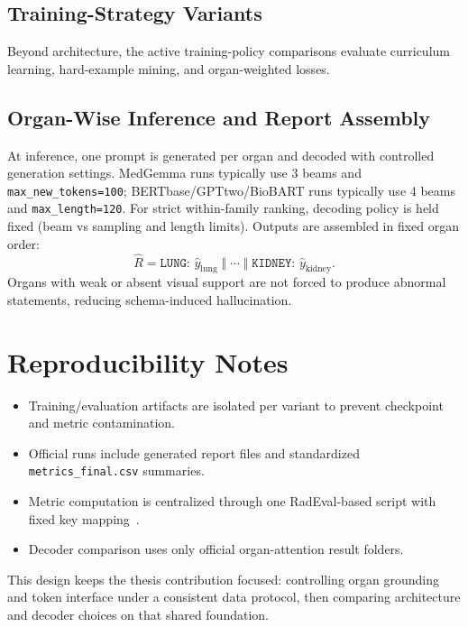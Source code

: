 \subsection{Training-Strategy Variants}
Beyond architecture, the active training-policy comparisons evaluate curriculum learning, hard-example mining, and organ-weighted losses.

\subsection{Organ-Wise Inference and Report Assembly}
At inference, one prompt is generated per organ and decoded with controlled generation settings. MedGemma runs typically use 3 beams and \texttt{max\_new\_tokens=100}; \ac{BERTbase}/\ac{GPTtwo}/BioBART runs typically use 4 beams and \texttt{max\_length=120}. For strict within-family ranking, decoding policy is held fixed (beam vs sampling and length limits). Outputs are assembled in fixed organ order:
\begin{equation}
\hat{R} = \texttt{LUNG: }\hat{y}_{\mathrm{lung}}\;\Vert\;\cdots\;\Vert\;\texttt{KIDNEY: }\hat{y}_{\mathrm{kidney}}.
\end{equation}
Organs with weak or absent visual support are not forced to produce abnormal statements, reducing schema-induced hallucination.

\section{Reproducibility Notes}\label{sec:method_reproducibility}
\begin{itemize}
    \item Training/evaluation artifacts are isolated per variant to prevent checkpoint and metric contamination.
    \item Official runs include generated report files and standardized \texttt{metrics\_final.csv} summaries.
    \item Metric computation is centralized through one RadEval-based script with fixed key mapping~\cite{xu-etal-2025-radeval}.
    \item Decoder comparison uses only official organ-attention result folders.
\end{itemize}

This design keeps the thesis contribution focused: controlling organ grounding and token interface under a consistent data protocol, then comparing architecture and decoder choices on that shared foundation.
